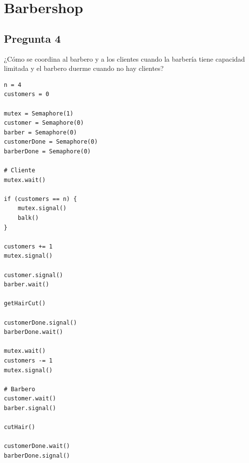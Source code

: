 \documentclass[12pt]{article}
\begin{document}
\section{Barbershop}

\subsection{Pregunta 4}

¿Cómo se coordina al barbero y a los clientes cuando la barbería tiene
capacidad limitada y el barbero duerme cuando no hay clientes?

\begin{lstlisting}
n = 4
customers = 0

mutex = Semaphore(1)
customer = Semaphore(0)
barber = Semaphore(0)
customerDone = Semaphore(0)
barberDone = Semaphore(0)

# Cliente
mutex.wait()

if (customers == n) {
    mutex.signal()
    balk()
}

customers += 1
mutex.signal()

customer.signal()
barber.wait()

getHairCut()

customerDone.signal()
barberDone.wait()

mutex.wait()
customers -= 1
mutex.signal()

# Barbero
customer.wait()
barber.signal()

cutHair()

customerDone.wait()
barberDone.signal()
\end{lstlisting}
\end{document}
